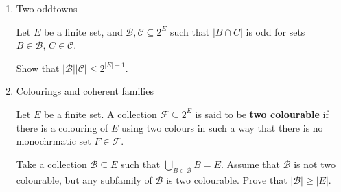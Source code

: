 \documentclass[kulak]{tplt}
\theoremstyle{definition}
\newcommand{\CC}{\mathcal C}
\newcommand{\BB}{\mathcal B}
\newcommand{\FF}{\mathcal F}
\begin{document}
\begin{enumerate}
\item Two oddtowns

Let $E$ be a finite set, and $\BB, \CC\subseteq 2^E$ such that $|B\cap C|$ is odd for sets $B\in \BB, \, C \in \CC$.

Show that $|\BB| |\CC| \leq 2^{|E|-1}$.


\item Colourings and coherent families

Let $E$ be a finite set.
A collection $\FF \subseteq 2^E $ is said to be \textbf{two colourable} if there is a colouring of $E$ using two colours in such a way that there is no monochrmatic set $F \in \FF$.

Take a collection $\BB \subseteq E$ such that $\bigcup_{B \in \BB} B = E$.
Assume that $\BB$ is not two colourable, but any subfamily of $\BB$ is two colourable.
Prove that $|\BB| \geq |E|$.



\end{enumerate}
\end{document}
